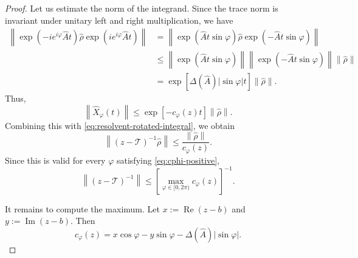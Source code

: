 \documentclass{SciPost}
\renewcommand{\Re}{\operatorname{Re}}
\renewcommand{\Im}{\operatorname{Im}}
\begin{document}
\begin{proof}
    Let us estimate the norm of the integrand. Since
    the trace norm is invariant under unitary left and right multiplication, we have
    \begin{equation}
        \begin{aligned}
            \left\|
            \exp\left(
                -i e^{i\varphi} \hat A t
            \right)
            \hat \rho
            \exp\left(
                i e^{i\varphi} \hat A t
            \right)
            \right\|
            &=
            \left\|
            \exp\left(
                \hat A t \sin\varphi
            \right)
            \hat \rho
            \exp\left(
                -\hat A t \sin\varphi
            \right)
            \right\| \\
            &\leqslant
            \left\|
            \exp\left(
                \hat A t \sin\varphi
            \right)
            \right\|
            \left\|
            \exp\left(
                -\hat A t \sin\varphi
            \right)
            \right\|
            \left\|
            \hat \rho
            \right\| \\
            &=
            \exp\left[
            \Delta(\hat A)\left|\sin\varphi\right| t
            \right] \left \| \hat \rho \right \|.
        \end{aligned}
    \end{equation}
    Thus,
    \begin{equation}
        \left\|
        \hat X_\varphi(t)
        \right\|
        \leqslant
        \exp\left[
            -c_\varphi(z)t
        \right]
        \left\|
        \hat \rho
        \right\|.
    \end{equation}
    Combining this with \eqref{eq:resolvent-rotated-integral}, we obtain
    \begin{equation}
        \left\|
        (z-\mathcal T)^{-1}\hat \rho
        \right\|
        \leqslant
        \frac{\left\|
        \hat \rho
        \right\|}{c_\varphi(z)}.
    \end{equation}
    Since this is valid for every \(\varphi\) satisfying \eqref{eq:cphi-positive},
    \begin{equation}
        \left\|
        (z-\mathcal T)^{-1}
        \right\|
        \leqslant
        \left[
            \max_{\varphi \in [0,2\pi)}
            c_\varphi(z)
        \right]^{-1}.
        \label{eq:resolvent-bound-cphi}
    \end{equation}

    It remains to compute the maximum. Let
    $x := \Re(z-b)$ and 
    $y := \Im(z-b)$.
    Then
    \begin{equation}
        c_\varphi(z)
        =
        x\cos\varphi - y\sin\varphi - \Delta(\hat A)\left|\sin\varphi\right|.
    \end{equation}


\end{proof}
\end{document}
